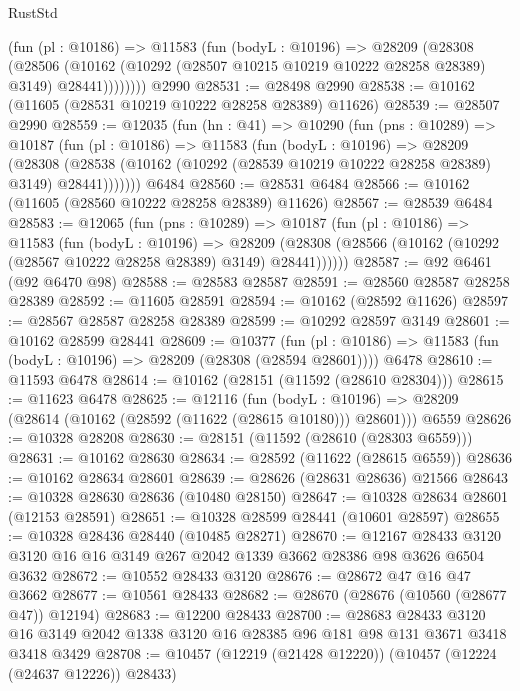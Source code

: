 \begin{lexlean}{RustStd}
\begin{coremodule}
          (fun (pl : @10186) =>
          @11583
            (fun (bodyL : @10196) =>
            @28209
              (@28308
                (@28506
                  (@10162 (@10292 (@28507 @10215 @10219 @10222 @28258 @28389) @3149) @28441))))))))
    @2990
@28531 := @28498 @2990
@28538 := @10162 (@11605 (@28531 @10219 @10222 @28258 @28389) @11626)
@28539 := @28507 @2990
@28559 := @12035
    (fun (hn : @41) =>
    @10290
      (fun (pns : @10289) =>
      @10187
        (fun (pl : @10186) =>
        @11583
          (fun (bodyL : @10196) =>
          @28209
            (@28308
              (@28538 (@10162 (@10292 (@28539 @10219 @10222 @28258 @28389) @3149) @28441)))))))
    @6484
@28560 := @28531 @6484
@28566 := @10162 (@11605 (@28560 @10222 @28258 @28389) @11626)
@28567 := @28539 @6484
@28583 := @12065
    (fun (pns : @10289) =>
    @10187
      (fun (pl : @10186) =>
      @11583
        (fun (bodyL : @10196) =>
        @28209 (@28308 (@28566 (@10162 (@10292 (@28567 @10222 @28258 @28389) @3149) @28441))))))
@28587 := @92 @6461 (@92 @6470 @98)
@28588 := @28583 @28587
@28591 := @28560 @28587 @28258 @28389
@28592 := @11605 @28591
@28594 := @10162 (@28592 @11626)
@28597 := @28567 @28587 @28258 @28389
@28599 := @10292 @28597 @3149
@28601 := @10162 @28599 @28441
@28609 := @10377
    (fun (pl : @10186) => @11583 (fun (bodyL : @10196) => @28209 (@28308 (@28594 @28601))))
    @6478
@28610 := @11593 @6478
@28614 := @10162 (@28151 (@11592 (@28610 @28304)))
@28615 := @11623 @6478
@28625 := @12116
    (fun (bodyL : @10196) => @28209 (@28614 (@10162 (@28592 (@11622 (@28615 @10180))) @28601)))
    @6559
@28626 := @10328 @28208
@28630 := @28151 (@11592 (@28610 (@28303 @6559)))
@28631 := @10162 @28630
@28634 := @28592 (@11622 (@28615 @6559))
@28636 := @10162 @28634 @28601
@28639 := @28626 (@28631 @28636) @21566
@28643 := @10328 @28630 @28636 (@10480 @28150)
@28647 := @10328 @28634 @28601 (@12153 @28591)
@28651 := @10328 @28599 @28441 (@10601 @28597)
@28655 := @10328 @28436 @28440 (@10485 @28271)
@28670 := @12167
    @28433
    @3120
    @3120
    @16
    @16
    @3149
    @267
    @2042
    @1339
    @3662
    @28386
    @98
    @3626
    @6504
    @3632
@28672 := @10552 @28433 @3120
@28676 := @28672 @47 @16 @47 @3662
@28677 := @10561 @28433
@28682 := @28670 (@28676 (@10560 (@28677 @47)) @12194)
@28683 := @12200 @28433
@28700 := @28683
    @28433
    @3120
    @16
    @3149
    @2042
    @1338
    @3120
    @16
    @28385
    @96
    @181
    @98
    @131
    @3671
    @3418
    @3418
    @3429
@28708 := @10457 (@12219 (@21428 @12220)) (@10457 (@12224 (@24637 @12226)) @28433)

\end{coremodule}
\end{lexlean}
